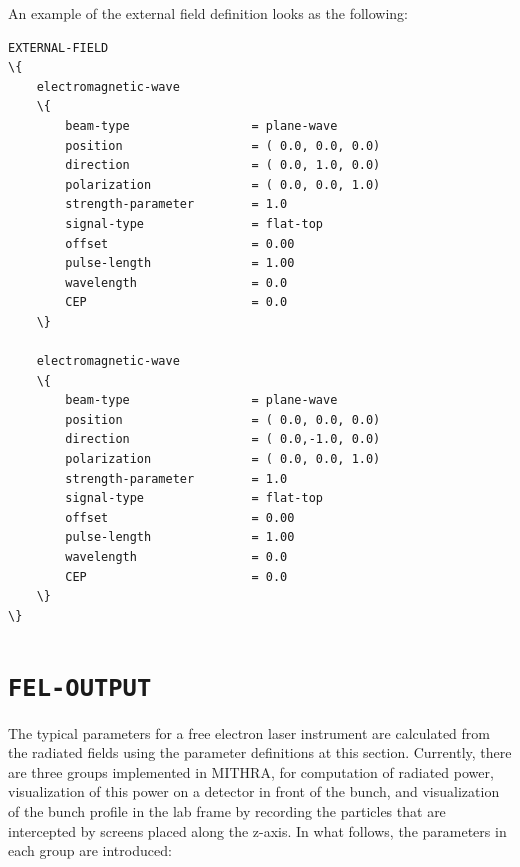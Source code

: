 An example of the external field definition looks as the following:
%
\begin{snugshade}
\begin{Verbatim}[fontsize=\small, tabsize=4, fontfamily=courier, fontseries=b, commandchars=\\\{\}, obeytabs]
EXTERNAL-FIELD
\{
	electromagnetic-wave
	\{
		beam-type				  = plane-wave
		position				  = ( 0.0, 0.0, 0.0)
    	direction				  = ( 0.0, 1.0, 0.0)
    	polarization			  = ( 0.0, 0.0, 1.0)
    	strength-parameter		  = 1.0
    	signal-type				  = flat-top
    	offset					  = 0.00
    	pulse-length			  = 1.00
    	wavelength				  = 0.0
    	CEP						  = 0.0
	\}
	
	electromagnetic-wave
	\{
		beam-type				  = plane-wave
		position				  = ( 0.0, 0.0, 0.0)
		direction				  = ( 0.0,-1.0, 0.0)
		polarization			  = ( 0.0, 0.0, 1.0)
		strength-parameter		  = 1.0
		signal-type				  = flat-top
		offset					  = 0.00
		pulse-length			  = 1.00
		wavelength				  = 0.0
		CEP						  = 0.0
	\}
\}
\end{Verbatim}
\end{snugshade}
%

\section{\texttt{FEL-OUTPUT}}

The typical parameters for a free electron laser instrument are calculated from the radiated fields using the parameter definitions at this section.
%
Currently, there are three groups implemented in MITHRA, for computation of radiated power, visualization of this power on a detector in front of the bunch, and visualization of the bunch profile in the lab frame by recording the particles that are intercepted by screens placed along the z-axis.
%
In what follows, the parameters in each group are introduced:

